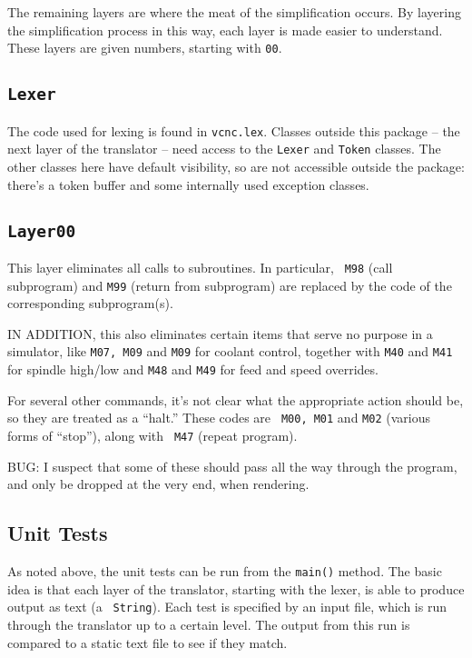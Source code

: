\documentclass[titlepage,oneside,10pt]{article}
\begin{document}
The remaining layers are where the meat of the simplification
occurs. By layering the simplification process in this way, each layer
is made easier to understand. These layers are given numbers, starting
with {\tt 00}.

\subsection{\tt Lexer}

The code used for lexing is found in {\tt vcnc.lex}. Classes outside
this package -- the next layer of the translator -- need access to the
{\tt Lexer} and {\tt Token} classes. The other classes here have
default visibility, so are not accessible outside the package: there's
a token buffer and some internally used exception classes.


\subsection{\tt Layer00}

This layer eliminates all calls to subroutines. In particular, {\tt
  M98} (call subprogram) and {\tt M99} (return from subprogram) are
replaced by the code of the corresponding subprogram(s).

IN ADDITION, this also eliminates certain items that serve no purpose
in a simulator, like {\tt M07, M09} and {\tt M09} for coolant
control, together with {\tt M40} and {\tt M41} for spindle high/low
and {\tt M48} and {\tt M49} for feed and speed overrides.

For several other commands, it's not clear what the appropriate action
should be, so they are treated as a ``halt.'' These codes are {\tt
  M00, M01} and {\tt M02} (various forms of ``stop''), along with {\tt
  M47} (repeat program).

BUG: I suspect that some of these should pass all the way through the
program, and only be dropped at the very end, when rendering.

\subsection{Unit Tests}

As noted above, the unit tests can be run from the {\tt main()}
method. The basic idea is that each layer of the translator, starting
with the lexer, is able to produce output as text (a {\tt
  String}). Each test is specified by an input file, which is run
through the translator up to a certain level. The output from this run
is compared to a static text file to see if they match.
\end{document}
